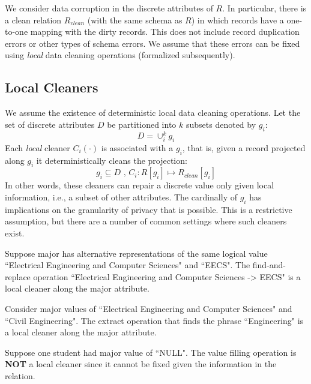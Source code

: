 We consider data corruption in the discrete attributes of $R$.
In particular, there is a clean relation $R_{clean}$ (with the same schema as $R$) in which records have a one-to-one mapping with the dirty records.
This does not include record duplication errors or other types of schema errors.
We assume that these errors can be fixed using \emph{local} data cleaning operations (formalized subsequently).

\subsection{Local Cleaners}
We assume the existence of deterministic local data cleaning operations.
Let the set of discrete attributes $D$ be partitioned into $k$ subsets denoted by $g_i$:
\[
D = \cup_i^k g_i
\] 
Each \emph{local} cleaner $C_i(\cdot)$ is associated with a $g_i$, that is, given a record projected along $g_i$ it deterministically cleans the projection:
\[
g_i \subseteq D \text{ , } C_i : R[g_i] \mapsto R_{clean}[g_i]
\]
In other words, these cleaners can repair a discrete value only given local information, i.e., a subset of other attributes.
The cardinally of $g_i$ has implications on the granularity of privacy that is possible.
This is a restrictive assumption, but there are a number of common settings where such cleaners exist.

\begin{example}
Suppose \textsf{major} has alternative representations of the same logical value ``Electrical Engineering and Computer Sciences" and ``EECS". The find-and-replace operation ``Electrical Engineering and Computer Sciences -> EECS" is a local cleaner along the \textsf{major} attribute.
\end{example}

\begin{example}
Consider \textsf{major} values of ``Electrical Engineering and Computer Sciences" and ``Civil Engineering". The extract operation that finds the phrase ``Engineering" is a local cleaner along the \textsf{major} attribute.
\end{example}

\begin{example}
Suppose one student had \textsf{major} value of ``NULL". The value filling operation is \textbf{NOT} a local cleaner since it cannot be fixed given the information in the relation.
\end{example}

